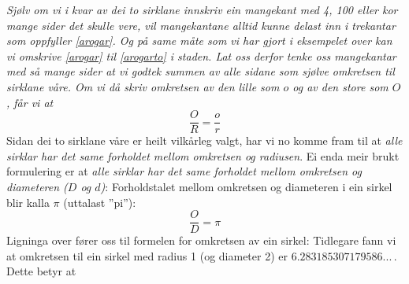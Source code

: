 \textsl{Sjølv om vi i kvar av dei to sirklane innskriv ein mangekant med 4, 100 eller kor mange sider det skulle vere, vil mangekantane alltid kunne delast inn i trekantar som oppfyller \eqref{arogar}. Og på same måte som vi har gjort i eksempelet over kan vi omskrive \eqref{arogar} til \eqref{arogarto} i staden. Lat oss derfor tenke oss mangekantar med så mange sider at vi godtek summen av alle sidane som sjølve omkretsen til sirklane våre. Om vi då skriv omkretsen av den lille som $ o $ og av den store som $ O $, får vi at}
\[ \frac{O}{R}=\frac{o}{r} \]
Sidan dei to sirklane våre er heilt vilkårleg valgt, har vi no komme fram til at \textit{alle sirklar har det same forholdet mellom omkretsen og radiusen}. Ei enda meir brukt formulering er at \textit{alle sirklar har det same forholdet mellom omkretsen og diameteren ($ D $ og $ d $)}:
Forholdstalet mellom omkretsen og diameteren i ein sirkel blir kalla $ \pi $ (uttalast ''pi''):
\[ \frac{O}{D}=\pi \]
Ligninga over fører oss til formelen for omkretsen av ein sirkel:
Tidlegare fann vi at omkretsen til ein sirkel med radius 1 (og diameter 2) er $ 6.283185307179586... $\,. Dette betyr at


